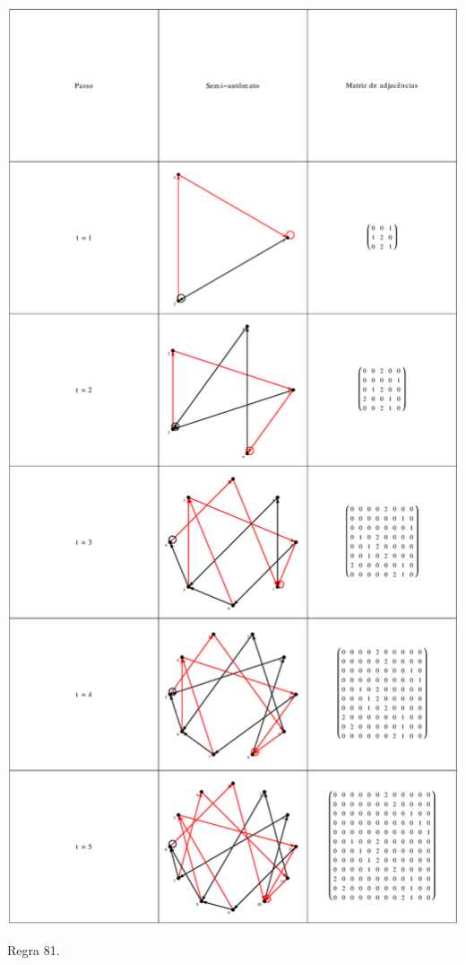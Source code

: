 \documentclass[12pt,a4paper]{article}
\begin{document}
\begin{table}[H]
\begin{center}
\includegraphics[scale=0.32]{img/mat/matr81.eps}
\caption{Regra 81.}
\label{tab:mr81}
\end{center}
\end{table}
\end{document}
